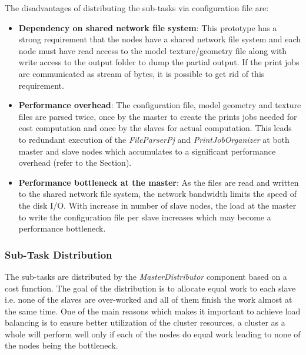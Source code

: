 The disadvantages of distributing the sub-tasks via configuration file are: 
\begin{itemize}
\item \textbf{Dependency on shared network file system}: This prototype has a strong requirement that the nodes have a shared network file system and each node must have read access to the model texture/geometry file along with write access to the output folder to dump the partial output. If the print jobs are communicated as stream of bytes, it is possible to get rid of this requirement.
\item \textbf{Performance overhead}: The configuration file, model geometry and texture files are parsed twice, once by the master to create the prints jobs needed for cost computation and once by the slaves for actual computation. This leads to redundant execution of the \textit{FileParserPj} and \textit{PrintJobOrganizer} at both master and slave nodes which accumulates to a significant performance overhead (refer to the Section).
\item \textbf{Performance bottleneck at the master}: As the files are read and written to the shared network file system, the network bandwidth limits the speed of the disk I/O. With increase in number of slave nodes, the load at the master to write the configuration file per slave increases which may become a performance bottleneck. 
\end{itemize}

\subsubsection{Sub-Task Distribution}

The sub-tasks are distributed by the \textit{MasterDistributor} component based on a cost function. The goal of the distribution is to allocate equal work to each slave i.e. none of the slaves are over-worked and all of them finish the work almost at the same time. One of the main reasons which makes it important to achieve load balancing is to ensure better utilization of the cluster resources, a cluster as a whole will perform well only if each of the nodes do equal work leading to none of the nodes being the bottleneck. 

